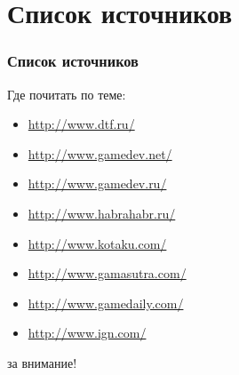 \section{Список источников}
\begin{frame}
    \frametitle{Список источников}
    Где почитать по теме:
    \begin{itemize}
        \item \url{http://www.dtf.ru/}
        \item \url{http://www.gamedev.net/}
        \item \url{http://www.gamedev.ru/}
        \item \url{http://www.habrahabr.ru/}
        \item \url{http://www.kotaku.com/}
        \item \url{http://www.gamasutra.com/}
        \item \url{http://www.gamedaily.com/}
        \item \url{http://www.ign.com/}
    \end{itemize}
\end{frame}

\begin{frame}
    \Huge{} за внимание!
\end{frame}